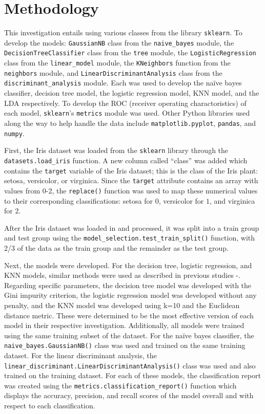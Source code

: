 \documentclass[journal]{IEEEtran}
\begin{document}
\section{Methodology}
\label{sec:methodology}

This investigation entails using various classes from the library \lstinline{sklearn}. To develop the models: \lstinline{GaussianNB} class from the \lstinline{naive_bayes} module, the \lstinline{DecisionTreeClassifier} class from the \lstinline{tree} module, the \lstinline{LogisticRegression} class from the \lstinline{linear_model} module, the \lstinline{KNeighbors} function from the \lstinline{neighbors} module, and \lstinline{LinearDiscriminantAnalysis} class from the \lstinline{discriminant_analysis} module. Each was used to develop the naïve bayes classifier, decision tree model, the logistic regression model, KNN model, and the LDA respectively. To develop the ROC (receiver operating charactoristics) of each model,  \lstinline{sklearn}'s \lstinline{metrics} module was used. Other Python libraries used along the way to help handle the data include \lstinline{matplotlib.pyplot}, \lstinline{pandas}, and \lstinline{numpy}. 

First, the Iris dataset was loaded from the \lstinline{sklearn} library through the \lstinline{datasets.load_iris} function. A new column called “class” was added which contains the \lstinline{target} variable of the Iris dataset; this is the class of the Iris plant: setosa, versicolor, or virginica. Since the \lstinline{target} attribute contains an array with values from 0-2, the \lstinline{replace()} function was used to map these numerical values to their corresponding classifications: setosa for \(0\), versicolor for \(1\), and virginica for \(2\). 

After the Iris dataset was loaded in and processed, it was split into a train group and test group using the \lstinline{model_selection.test_train_split()} function, with 2/3 of the data as the train group and the remainder as the test group. 

Next, the models were developed. For the decision tree, logistic regression, and KNN models, similar methods were used as described in previous studies \cite{b3}-\cite{b5}. Regarding specific parameters, the decision tree model was developed with the Gini impurity criterion, the logistic regression model was developed without any penalty, and the KNN model was developed using k=10 and the Euclidean distance metric. These were determined to be the most effective version of each model in their respective investigation. Additionally, all models were trained using the same training subset of the dataset. For the naïve bayes classifier, the \lstinline{naive_bayes.GaussianNB()} class was used and trained on the same training dataset. For the linear discriminant analysis, the \lstinline{linear_discriminant.LinearDiscriminantAnalysis()} class was used and also trained on the training dataset. For each of these models, the classification report was created using the \lstinline{metrics.classification_report()} function which displays the accuracy, precision, and recall scores of the model overall and with respect to each classification. 
\end{document}
